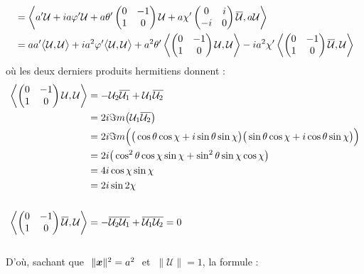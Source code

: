 \begin{annexe}
\begin{demo}
\begin{align*}
		&= \left\langle a'\mathcal{U} + ia\varphi' \mathcal{U} + a\theta'\begin{pmatrix} 0 & -1 \\ 1 & 0 \end{pmatrix}\mathcal{U} + a\chi'\begin{pmatrix} 0 & i \\ -i & 0 \end{pmatrix}\overline{\mathcal{U}}, a\mathcal{U} \right\rangle \\
		&= aa' \big\langle \mathcal{U}, \mathcal{U}\big\rangle  + ia^2\varphi' \big\langle \mathcal{U}, \mathcal{U}\big\rangle  + a^2\theta'\left\langle \begin{pmatrix} 0 & -1 \\ 1 & 0 \end{pmatrix}\mathcal{U}, \mathcal{U} \right\rangle - ia^2\chi'\left\langle \begin{pmatrix} 0 & -1 \\ 1 & 0 \end{pmatrix}\overline{\mathcal{U}}, \mathcal{U} \right\rangle
	\end{align*}
	où les deux derniers produits hermitiens donnent :
	\begin{align*}
		\left\langle \begin{pmatrix} 0 & -1 \\ 1 & 0 \end{pmatrix}\mathcal{U}, \mathcal{U} \right\rangle &= -\mathcal{U}_2\overline{\mathcal{U}_1} + \mathcal{U}_1\overline{\mathcal{U}_2} \\
		&= 2i\Im m\big(\mathcal{U}_1 \overline{\mathcal{U}_2}\big) \\
		&= 2i\Im m\Big(\big( \cos\theta \cos\chi + i \sin\theta \sin\chi \big) \big( \sin\theta \cos\chi + i \cos\theta \sin\chi \big)\Big) \\
		&= 2i\big(\cos^2\theta \cos\chi \sin\chi + \sin^2\theta \sin\chi \cos\chi \big) \\
		&= 4i \cos\chi \sin\chi \\
		&= 2i\sin2\chi 
		\\ \\
		\left\langle \begin{pmatrix} 0 & -1 \\ 1 & 0 \end{pmatrix}\overline{\mathcal{U}}, \mathcal{U} \right\rangle &= -\overline{\mathcal{U}_2\mathcal{U}_1} + \overline{\mathcal{U}_1\mathcal{U}_2} = 0
	\end{align*}
	\\
	D'où, sachant que $\ \|\boldsymbol{x}\|^2=a^2\ $ et $\ \|\mathcal{U}\|=1$, la formule :

\end{demo}
\end{annexe}
